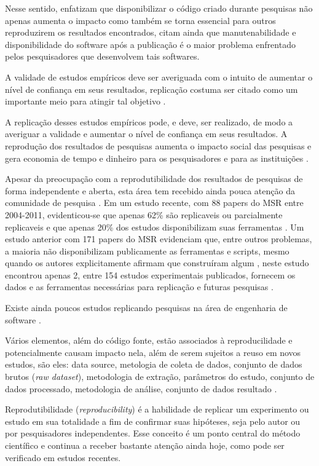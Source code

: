 Nesse sentido,  enfatizam que disponibilizar o código
criado durante pesquisas não apenas aumenta o impacto como também se torna
essencial para outros reproduzirem os resultados encontrados, citam ainda que
manutenabilidade e disponibilidade do software após a publicação é o maior
problema enfrentado pelos pesquisadores que desenvolvem tais softwares.

A validade de estudos empíricos deve ser averiguada com o intuito
de aumentar o nível de confiança em seus resultados, replicação costuma ser
citado como um importante meio para atingir tal objetivo \cite{Almqvist2006}.

A replicação desses estudos empíricos pode, e deve, ser realizado, de modo a
averiguar a validade e aumentar o nível de confiança em seus resultados. A
reprodução dos resultados de pesquisas aumenta o impacto social das pesquisas e
gera economia de tempo e dinheiro para os pesquisadores e para as instituições
\cite{Nesta2010}.

Apesar da preocupação com a reprodutibilidade dos
resultados de pesquisas de forma independente \cite{Stodden2009} e aberta,
esta área tem recebido ainda pouca atenção da comunidade de pesquisa
\cite{Nancy2015, Grand2010Open}. Em um estudo recente, com 88 papers do MSR
entre 2004-2011, evidenticou-se que apenas 62\% são replicaveis ou parcialmente
replicaveis e que apenas 20\% dos estudos disponibilizam suas ferramentas
\cite{amann2015software}. Um estudo anterior com 171 papers do MSR evidenciam
que, entre outros problemas, a maioria não disponibilizam publicamente as
ferramentas e scripts, mesmo quando os autores explicitamente afirmam que
construíram algum \cite{robles2010replicating}, neste estudo encontrou apenas
2, entre 154 estudos experimentais publicados, fornecem os dados e as ferramentas
necessárias para replicação e futuras pesquisas \cite{barr2010shoulders}.

Existe ainda poucos estudos replicando pesquisas na área de
engenharia de software \cite{da2011replication}.

Vários elementos, além do código fonte, estão associados à reproducilidade e
potencialmente causam impacto nela, além de serem sujeitos a reuso em novos
estudos, são eles: data source, metologia de coleta de dados, conjunto de dados
brutos ({\it raw dataset}), metodologia de extração, parâmetros do estudo,
conjunto de dados processado, metodologia de análise, conjunto de dados
resultado \cite{gonzalez2012reproducibility}.

Reprodutibilidade ({\it reproducibility}) é a habilidade de replicar um experimento
ou estudo em sua totalidade a fim de confirmar suas hipóteses, seja pelo
autor ou por pesquisadores independentes. Esse conceito é um ponto
central do método científico e continua a receber bastante atenção ainda hoje,
como pode ser verificado em estudos recentes.


